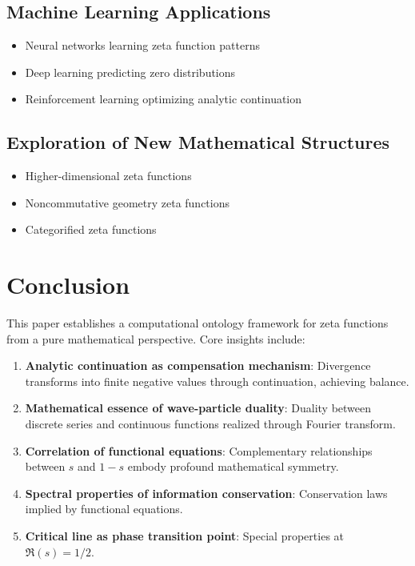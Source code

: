 \documentclass[11pt]{article}
\begin{document}
\subsection{Machine Learning Applications}

\begin{itemize}
\item Neural networks learning zeta function patterns
\item Deep learning predicting zero distributions
\item Reinforcement learning optimizing analytic continuation
\end{itemize}

\subsection{Exploration of New Mathematical Structures}

\begin{itemize}
\item Higher-dimensional zeta functions
\item Noncommutative geometry zeta functions
\item Categorified zeta functions
\end{itemize}

\section{Conclusion}

This paper establishes a computational ontology framework for zeta functions from a pure mathematical perspective. Core insights include:

\begin{enumerate}
\item \textbf{Analytic continuation as compensation mechanism}: Divergence transforms into finite negative values through continuation, achieving balance.

\item \textbf{Mathematical essence of wave-particle duality}: Duality between discrete series and continuous functions realized through Fourier transform.

\item \textbf{Correlation of functional equations}: Complementary relationships between $s$ and $1-s$ embody profound mathematical symmetry.

\item \textbf{Spectral properties of information conservation}: Conservation laws implied by functional equations.

\item \textbf{Critical line as phase transition point}: Special properties at $\Re(s) = 1/2$.
\end{enumerate}
\end{document}

